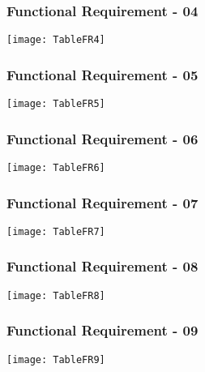 \begin{figure}[ht]
\subsubsection{Functional Requirement - 04}
\centering
\texttt{[image: TableFR4]}
\end{figure}

\begin{figure}[ht]
\subsubsection{Functional Requirement - 05}
\centering
\texttt{[image: TableFR5]}
\end{figure}

\begin{figure}[ht]
\subsubsection{Functional Requirement - 06}
\centering
\texttt{[image: TableFR6]}
\end{figure}

\begin{figure}[ht]
\subsubsection{Functional Requirement - 07}
\centering
\texttt{[image: TableFR7]}
\end{figure}

\begin{figure}[ht]
\subsubsection{Functional Requirement - 08}
\centering
\texttt{[image: TableFR8]}
\end{figure}

\begin{figure}[ht]
\subsubsection{Functional Requirement - 09}
\centering
\texttt{[image: TableFR9]}
\end{figure}

